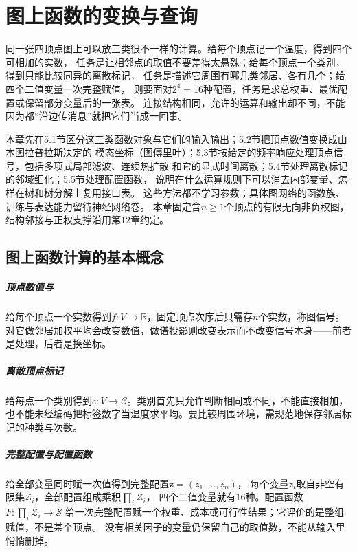 \chapter{图上函数的变换与查询}
\label{chap:graph-functions}

同一张四顶点图上可以放三类很不一样的计算。给每个顶点记一个温度，得到四个可相加的实数，
任务是让相邻点的取值不要差得太悬殊；给每个顶点一个类别，得到只能比较同异的离散标记，
任务是描述它周围有哪几类邻居、各有几个；给四个二值变量一次完整赋值，
则要面对$2^4=16$种配置，任务是求总权重、最优配置或保留部分变量后的一张表。
连接结构相同，允许的运算和输出却不同，不能因为都“沿边传消息”就把它们当成一回事。

本章先在5.1节区分这三类函数对象与它们的输入输出；5.2节把顶点数值变换成由本图拉普拉斯决定的
模态坐标（图傅里叶）；5.3节按给定的频率响应处理顶点信号，包括多项式局部滤波、连续热扩散
和它的显式时间离散；5.4节处理离散标记的邻域细化；5.5节处理配置函数，
说明在什么运算规则下可以消去内部变量、怎样在树和树分解上复用接口表。
这些方法都不学习参数；具体图网络的函数族、训练与表达能力留待神经网络卷。
本章固定含$n\geq1$个顶点的有限无向非负权图，结构邻接与正权支撑沿用第12章约定。

\section{图上函数计算的基本概念}

\paragraph{顶点数值与}
给每个顶点一个实数得到$f:V\to\mathbb R$，固定顶点次序后只需存$n$个实数，称图信号。
对它做邻居加权平均会改变数值，做谱投影则改变表示而不改变信号本身——前者是处理，后者是换坐标。

\paragraph{离散顶点标记}
给每点一个类别得到$c:V\to\mathcal C$。类别首先只允许判断相同或不同，不能直接相加，
也不能未经编码把标签数字当温度求平均。要比较周围环境，需规范地保存邻居标记的种类与次数。

\paragraph{完整配置与配置函数}
给全部变量同时赋一次值得到完整配置$\bm z=(z_1,\ldots,z_n)$，
每个变量$z_i$取自非空有限集$\mathcal Z_i$，全部配置组成乘积$\prod_i\mathcal Z_i$，
四个二值变量就有$16$种。配置函数$F:\prod_i\mathcal Z_i\to\mathcal S$
给一次完整配置赋一个权重、成本或可行性结果；它评价的是整组赋值，不是某个顶点。
没有相关因子的变量仍保留自己的取值数，不能从输入里悄悄删掉。

